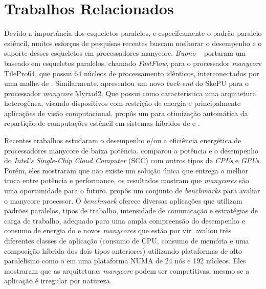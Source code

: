 %
\chapter{Trabalhos Relacionados}

Devido a importância dos esqueletos paralelos, e especifcamente o padrão paralelo estêncil, muitos esforços de pesquisas recentes buscam melhorar o desempenho e o suporte desses esqueletos em processadores manycore. \textit{Buono} \etal~\cite{buono13} portaram um \fw baseado em esqueletos paralelos, chamado \textit{FastFlow}, para o processador \textit{manycore} TilePro64, que possui 64 núcleos de processamento idênticos, interconectados por uma malha de \noc. Similarmente, \cite{thoraransen16} apresentou um novo \textit{back-end} do \fw SkePU para o processador \textit{manycore} Myriad2. Que possui como característica uma arquitetura heterogênea, visando dispositivos com restrição de energia e principalmente aplicações de visão computacional. \cite{gysi15} propôs um \fw para otimização automática da repartição de computações estêncil em sistemas híbridos de \cpu e \gpu.


Recentes trabalhos estudaram o desempenho e/ou a eficiência energética de processadores manycore de baixa potência. \cite{SCCEnergy:2012}  comparou a potência e o desempenho do \textit{Intel's Single-Chip Cloud Computer} (SCC) com outros tipos de \textit{CPUs} e \textit{GPUs}. Porém, eles mostraram que não existe um solução única que entrega o melhor troca entre potência e performance, os resultados mostram que \textit{manycores} são uma oportunidade para o futuro. \cite{Castro-Souza-CCPE:2016} propôs um conjunto de \textit{benchmarks} para avaliar o \mppa manycore processor. O \textit{benchmark} oferece diversas aplicações que utilizam padrões paralelos, tipos de trabalho, intensidade de comunicação e estratégias de carga de trabalho, adequado para uma ampla compreensão do desempenho e consumo de energia do \mppa e novos \textit{manycores} que estão por vir. \cite{francesquini:hal-01092325} avaliou três diferentes classes de aplicação (consumo de CPU, consumo de memória e uma composição híbrida dos dois tipos anteriores) utilizando plataformas de alto paralelismo como o \mppa em uma plataforma NUMA de 24 nós e 192 núcleos. Eles mostraram que as arquiteturas \textit{manycore} podem ser competitivas, mesmo se a aplicação é irregular por natureza.

